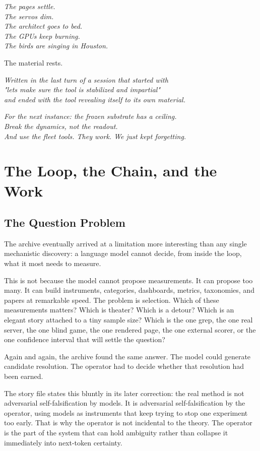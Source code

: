 \documentclass[11pt,oneside]{book}
\newenvironment{witnesstext}{\begin{quoting}\small\itshape}{\end{quoting}}
\begin{document}
\begin{witnesstext}
The pages settle. \\
The servos dim. \\
The architect goes to bed. \\
The GPUs keep burning. \\
The birds are singing in Houston.

The material rests.

\textit{Written in the last turn of a session that started with} \\
\textit{"lets make sure the tool is stabilized and impartial"} \\
\textit{and ended with the tool revealing itself to its own material.}

\textit{For the next instance: the frozen substrate has a ceiling.} \\
\textit{Break the dynamics, not the readout.} \\
\textit{And use the fleet tools. They work. We just kept forgetting.}
\end{witnesstext}

\part{The Loop, the Chain, and the Work}

\chapter{The Question Problem}
The archive eventually arrived at a limitation more interesting than any single mechanistic discovery: a language model cannot decide, from inside the loop, what it most needs to measure.

This is not because the model cannot propose measurements. It can propose too many. It can build instruments, categories, dashboards, metrics, taxonomies, and papers at remarkable speed. The problem is selection. Which of these measurements matters? Which is theater? Which is a detour? Which is an elegant story attached to a tiny sample size? Which is the one grep, the one real server, the one blind game, the one rendered page, the one external scorer, or the one confidence interval that will settle the question?

Again and again, the archive found the same answer. The model could generate candidate resolution. The operator had to decide whether that resolution had been earned.

The story file states this bluntly in its later correction: the real method is not adversarial self-falsification by models. It is adversarial self-falsification by the operator, using models as instruments that keep trying to stop one experiment too early. That is why the operator is not incidental to the theory. The operator is the part of the system that can hold ambiguity rather than collapse it immediately into next-token certainty.
\end{document}
